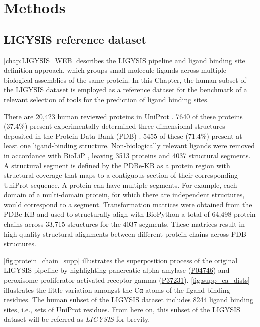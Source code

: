 \section{Methods}

\subsection{LIGYSIS reference dataset}

\autoref{chap:LIGYSIS_WEB} describes the LIGYSIS pipeline and ligand binding site definition approach, which groups small molecule ligands across multiple biological assemblies of the same protein. In this Chapter, the human subset of the LIGYSIS dataset is employed as a reference dataset for the benchmark of a relevant selection of tools for the prediction of ligand binding sites.

There are 20,423 human reviewed proteins in UniProt \cite{UNIPROT_2019_UNIPROT}. 7640 of these proteins (37.4\%) present experimentally determined three-dimensional structures deposited in the Protein Data Bank (PDB) \cite{ARMSTRONG_2020_PDBE}. 5455 of these (71.4\%) present at least one ligand-binding structure. Non-biologically relevant ligands were removed in accordance with BioLiP \cite{YANG_2013_BIOLIP}, leaving 3513 proteins and 4037 structural segments. A structural segment is defined by the PDBe-KB as a protein region with structural coverage that maps to a contiguous section of their corresponding UniProt sequence. A protein can have multiple segments. For example, each domain of a multi-domain protein, for which there are independent structures, would correspond to a segment. Transformation matrices were obtained from the PDBe-KB \cite{PDBE_2022_PDBEKB} and used to structurally align with BioPython \cite{COCK_2009_BIOPYTHON} a total of 64,498 protein chains across 33,715 structures for the 4037 segments. These matrices result in high-quality structural alignments between different protein chains across PDB structures.

\autoref{fig:protein_chain_supp} illustrates the superposition process of the original LIGYSIS pipeline by highlighting pancreatic alpha-amylase (\href{https://www.uniprot.org/uniprotkb/P04746/entry}{P04746}) and peroxisome proliferator-activated receptor gamma (\href{https://www.uniprot.org/uniprotkb/P37231/entry}{P37231}). \autoref{fig:supp_ca_dists} illustrates the little variation amongst the Cα atoms of the ligand binding residues. The human subset of the LIGYSIS dataset includes 8244 ligand binding sites, i.e., sets of UniProt residues. From here on, this subset of the LIGYSIS dataset will be referred as \textit{LIGYSIS} for brevity.

